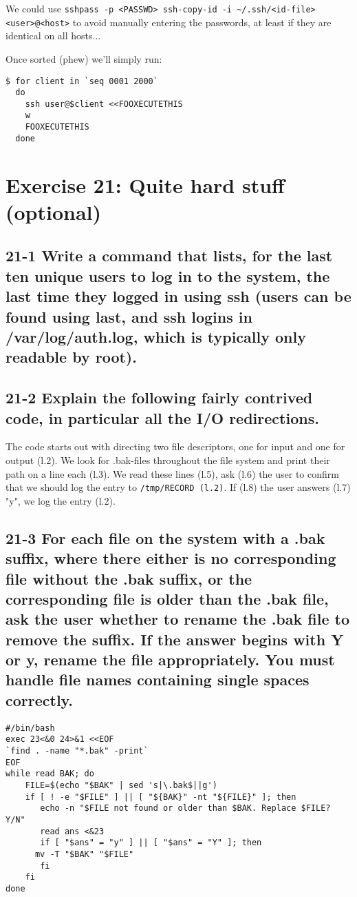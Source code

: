 We could use \verb=sshpass -p <PASSWD> ssh-copy-id -i ~/.ssh/<id-file> <user>@<host>= to avoid manually entering the passwords, at least if they are identical on all hosts...

Once sorted (phew) we'll simply run:

\begin{verbatim}
$ for client in `seq 0001 2000`
  do
    ssh user@$client <<FOOXECUTETHIS
    w
    FOOXECUTETHIS
  done
\end{verbatim}
\section{Exercise 21: Quite hard stuff (optional)}
\subsection{21-1 Write a command that lists, for the last ten unique users to log in to the system, the last time they logged in using ssh (users can be found using last, and ssh logins in /var/log/auth.log, which is typically only readable by root).}

\subsection{21-2 Explain the following fairly contrived code, in particular all the I/O redirections.}
The code starts out with directing two file descriptors, one for input and one for output (l.2). We look for .bak-files throughout the file system and print their path on a line each (l.3). We read these lines (l.5), ask (l.6) the user to confirm that we should log the entry to \verb=/tmp/RECORD (l.2)=. If (l.8) the user answers (l.7) "y", we log the entry (l.2).

\subsection{21-3 For each file on the system with a .bak suffix, where there either is no corresponding file without the .bak suffix, or the corresponding file is older than the .bak file, ask the user whether to rename the .bak file to remove the suffix. If the answer begins with Y or y, rename the file appropriately. You must handle file names containing single spaces correctly.}
\begin{verbatim}
#/bin/bash
exec 23<&0 24>&1 <<EOF
`find . -name "*.bak" -print`
EOF
while read BAK; do
    FILE=$(echo "$BAK" | sed 's|\.bak$||g')
    if [ ! -e "$FILE" ] || [ "${BAK}" -nt "${FILE}" ]; then
       echo -n "$FILE not found or older than $BAK. Replace $FILE? Y/N"
       read ans <&23
       if [ "$ans" = "y" ] || [ "$ans" = "Y" ]; then
	  mv -T "$BAK" "$FILE"
       fi
    fi
done
\end{verbatim}


